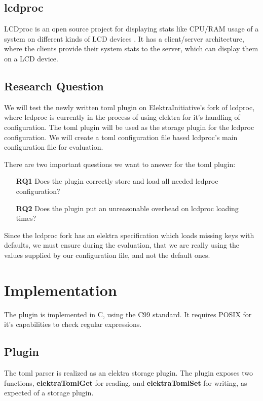 \documentclass[12pt]{report}
\begin{document}
\section{lcdproc}
LCDproc is an open source project for displaying stats like CPU/RAM usage of a system on different kinds of LCD devices \cite{lcdprocmain}\cite{lcdprocgit}.
It has a client/server architecture, where the clients provide their system stats to the server, which can display them on a LCD device.

\section{Research Question}
We will test the newly written toml plugin on ElektraInitiative's fork of lcdproc, where lcdproc is currently in the process of using elektra for it's handling of configuration.
The toml plugin will be used as the storage plugin for the lcdproc configuration.
We will create a \acrshort{toml} configuration file based lcdproc's main configuration file for evaluation.

There are two important questions we want to answer for the toml plugin:
\begin{itemize}
	\item[\textbf{RQ1}] Does the plugin correctly store and load all needed lcdproc configuration?
	\item[\textbf{RQ2}] Does the plugin put an unreasonable overhead on lcdproc loading times?
\end{itemize}
Since the lcdproc fork has an elektra specification which loads missing keys with defaults, we must ensure during the evaluation, that we are really using the values supplied by our configuration file, and not the default ones.

\chapter{Implementation}

The plugin is implemented in C, using the C99 standard. It requires POSIX for it's capabilities to check regular expressions.

\section{Plugin}
The toml parser is realized as an elektra storage plugin. The plugin exposes two functions, \textbf{elektraTomlGet} for reading, and \textbf{elektraTomlSet} for writing, as expected of a storage plugin.
\end{document}
